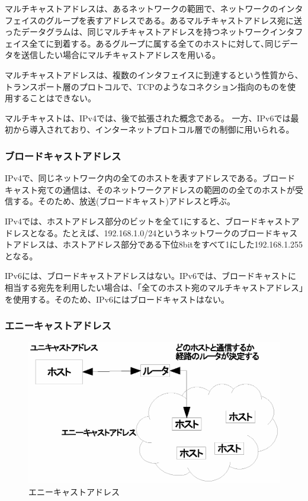 マルチキャストアドレスは、あるネットワークの範囲で、ネットワークのインタフェイスのグループを表すアドレスである。あるマルチキャストアドレス宛に送ったデータグラムは、同じマルチキャストアドレスを持つネットワークインタフェイス全てに到着する。あるグループに属する全てのホストに対して､同じデータを送信したい場合にマルチキャストアドレスを用いる。

マルチキャストアドレスは、複数のインタフェイスに到達するという性質から、トランスポート層のプロトコルで、TCPのようなコネクション指向のものを使用することはできない。

マルチキャストは、IPv4では、後で拡張された概念である。
一方、IPv6では最初から導入されており、インターネットプロトコル層での制御に用いられる。

\subsubsection{ブロードキャストアドレス}
IPv4で、同じネットワーク内の全てのホストを表すアドレスである。ブロードキャスト宛ての通信は、そのネットワークアドレスの範囲のの全てのホストが受信する。そのため、放送(ブロードキャスト)アドレスと呼ぶ。

IPv4では、ホストアドレス部分のビットを全て1にすると、ブロードキャストアドレスとなる。たとえば、192.168.1.0/24というネットワークのブロードキャストアドレスは、ホストアドレス部分である下位8bitをすべて1にした192.168.1.255となる。

IPv6には、ブロードキャストアドレスはない。IPv6では、ブロードキャストに相当する宛先を利用したい場合は、「全てのホスト宛のマルチキャストアドレス」を使用する。そのため、IPv6にはブロードキャストはない。

\subsubsection{エニーキャストアドレス}

\begin{figure}[htbp]
	\includegraphics[width=12cm,clip]{draw/anycast.eps}
	\caption{エニーキャストアドレス}
	\label{fig:anycast}
\end{figure}

